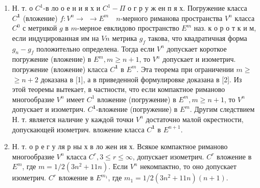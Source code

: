 \documentclass[10pt]{article}
\begin{document}
\begin{enumerate}

  \item Н. т. о $C^{1}$-в ло о е н и я х и $C^{1}-\Pi$ о г р у ж ен п я х. Погружение класса $C^{\mathbf{1}}$ (вложение) $f: V^{n} \rightarrow$ $\rightarrow E^{m} \quad n$-мерного риманова пространства $V^{n}$ класса $C^{0}$ с метрикой $g$ в $m$-мерное евклидово пространство $E^{m}$ наз. к о р о т к и м, если индуцированная им на $V n$ метрика $g_{f}$ такова, что квадратичная форма $g_{n}-g_{f}$ положительно определена. Тогда если $V^{n}$ допускает короткое погружение (вложение) в $E^{m}, m \geqslant n+1$, то $V^{n}$ допускает и изометрич. погружение (вложение) класса $C^{\mathbf{1}}$ в $E^{m}$. Эта теорема при ограничении $m \geqslant$ $\geqslant n+2$ доказана в [1], а в приведенной формулировке доказана в [2]. Из этой теоремы вытекает, в частности, что если компактное риманово многообразие $V^{n}$ имеет $C^{1}$ вложение (погружение) в $E^{m}, m \geqslant n+1$, то $V^{n}$ допускает и изометрич. $C^{\mathbf{1}}$-вложение (погружение) в $E^{m}$. Другим следствием Н. т. является наличие у каждой точки $V^{n}$ достаточно малой окрестности, допускающей изометрич. вложение класса $C^{\mathbf{1}}$ в $E^{n+1}$.



  \item Н. т. о р е г у ля р ны х в ло жен ия х. Всякое компактное риманово многообразие $V^{n}$ класса $C^{r}, 3 \leqslant r \leqslant \infty$, допускает изометрич. $C^{r}$ вложение в $E^{m}$, где $m=1 / 2\left(3 n^{2}+11 n\right)$. Если $V^{n}$ некомпактно, то оно допускает изометрич. $C^{r}$ вложение в $E^{m_{1}}$, где $m_{1}=1 / 2\left(3 n^{2}+11 n\right)(n+1)$.



\end{enumerate}
\end{document}
